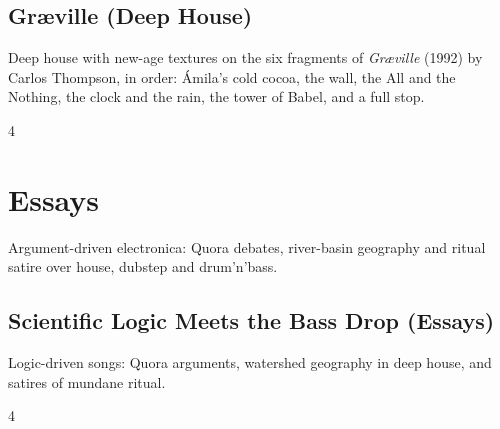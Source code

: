 \documentclass[a4paper,landscape]{memoir}
\begin{document}
\chapter{Gr\ae ville (Deep House)}
Deep house with new-age textures on the six fragments of \emph{Gr\ae ville} (1992) by Carlos Thompson, in order: Ámila's cold cocoa, the wall, the All and the Nothing, the clock and the rain, the tower of Babel, and a full stop.
\clearpage\begin{multicols*}{4}
\end{multicols*}

\part{Essays}
Argument-driven electronica: Quora debates, river-basin geography and ritual satire over house, dubstep and drum’n’bass.

\chapter{Scientific Logic Meets the Bass Drop (Essays)}
Logic-driven songs: Quora arguments, watershed geography in deep house, and satires of mundane ritual.
\clearpage\begin{multicols*}{4}
\end{multicols*}
\end{document}
